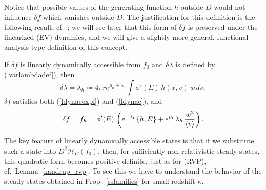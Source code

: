 \documentclass[11pt]{article}
\begin{document}
%
%
Notice that possible values of the generating function $h$ outside $D$
would not influence $\delta f$ which vanishes outside $D$.
The justification for this definition is the following result,
cf.~\cite[Prop.~3.2]{HaRe2013}; we will see later that this form
of $\delta f$ is preserved under the linearized (EV) dynamics,
and we will give a slightly more general, functional-analysis type
definition of this concept.
%
\begin{proposition} \label{ldynacprop}
  If $\delta f$ is linearly dynamically accessible from $f_0$
  and $\delta\lambda$ is defined by
  (\ref{varlambdadef}), then
  \begin{equation}\label{ldynaclambda}
    \delta\lambda = \lambda_h \coloneqq 4\pi r e^{\mu_0+\lambda_0}
    \int \phi'(E)\,h(x,v)\,w\,dv,
  \end{equation}
  $\delta f$ satisfies both (\ref{ldynacexpl}) and (\ref{ldynac}), and
  \begin{equation} \label{dynacdef}
    \delta f = f_h =
    \phi'(E)\,\left(e^{-\lambda_0}\{h,E\}
    + e^{\mu_0} \lambda_h \,\frac{w^2}{\left\langle v\right\rangle }\right).
  \end{equation}
\end{proposition}
%
%
The key feature of linearly dynamically accessible states is that
if we substitute such a state into $D^2\mathcal{H}_C(f_0)$, then,
for sufficiently non-relativistic steady states, this quadratic
form becomes positive definite, just as for (RVP), cf.~Lemma~\ref{kandrup_rvp}.
To see this we have to understand the behavior of the steady states
obtained in Prop.~\ref{ssfamilies} for small redshift $\kappa$.
%
\end{document}
